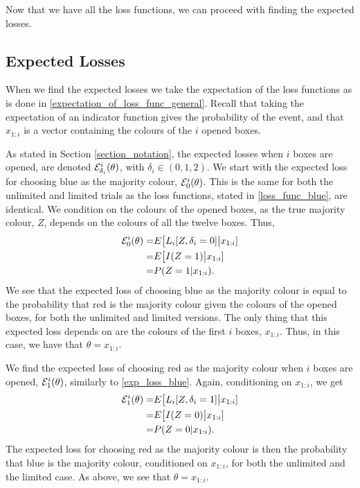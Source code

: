 Now that we have all the loss functions, we can proceed with finding the expected losses. 

\subsection{Expected Losses}
When we find the expected losses we take the expectation of the loss functions as is done in \eqref{expectation_of_loss_func_general}. Recall that taking the expectation of an indicator function gives the probability of the event, and that $x_{1:i}$ is a vector containing the colours of the $i$ opened boxes.

As stated in Section \ref{section_notation}, the expected losses when $i$ boxes are opened, are denoted $\mathcal{E}_{\delta_i}^i(\theta)$, with $\delta_i \in (0,1,2)$.
We start with the expected loss for choosing blue as the majority colour, $\mathcal{E}^i_0(\theta)$. This is the same for both the unlimited and limited trials as the loss functions, stated in \eqref{loss_func_blue}, are identical. 
We condition on the colours of the opened boxes, as the true majority colour, $Z$, depends on the colours of all the twelve boxes. Thus,
\begin{equation}
\label{exp_loss_blue}
    \begin{aligned}
        \mathcal{E}^i_{0}(\theta) = &E\big[ L_i[Z,\delta_i=0] \big |x_{1:i} ]\\
        = & E \big[ I(Z=1) \big|x_{1:i}]\\
        = & P(Z=1|x_{1:i}).
    \end{aligned}
\end{equation}
We see that the expected loss of choosing blue as the majority colour is equal to the probability that red is the majority colour given the colours of the opened boxes, for both the unlimited and limited versions. The only thing that this expected loss depends on are the colours of the first $i$ boxes, $x_{1:i}$. Thus, in this case, we have that $\theta = x_{1:i}$.

We find the expected loss of choosing red as the majority colour when $i$ boxes are opened, $\mathcal{E}^i_{1}(\theta)$, similarly to \eqref{exp_loss_blue}. Again, conditioning on $x_{1:i}$, we get
\begin{equation}
\label{exp_loss_red}
    \begin{aligned}
        \mathcal{E}^i_{1}(\theta) 
        = &E\big[ L_i[Z,\delta_i=1] \big |x_{1:i} ]\\
        = & E \big[ I(Z=0) \big|x_{1:i}]\\
        = & P(Z=0|x_{1:i}).
    \end{aligned}
\end{equation}
The expected loss for choosing red as the majority colour is then the probability that blue is the majority colour, conditioned on $x_{1:i}$, for both the unlimited and the limited case. As above, we see that $\theta = x_{1:i}$.

